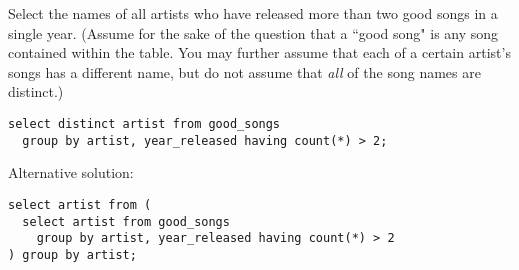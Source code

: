 \documentclass[twoside]{article}
\begin{document}
\begin{enumerate}
Select the names of all artists who have released more than two good songs in a single year. (Assume for the sake of the question that a ``good song" is any song contained within the table. You may further assume that each of a certain artist's songs has a different name, but do not assume that \textit{all} of the song names are distinct.)\\

\begin{lstlisting}
select distinct artist from good_songs
  group by artist, year_released having count(*) > 2;
\end{lstlisting}

Alternative solution:

\begin{lstlisting}
select artist from (
  select artist from good_songs
    group by artist, year_released having count(*) > 2
) group by artist;
\end{lstlisting}

\end{enumerate}
\end{document}

